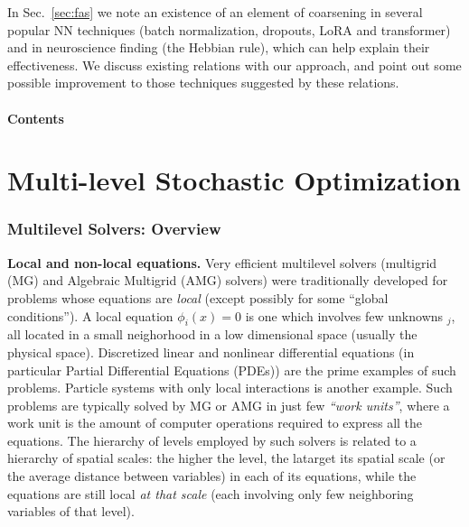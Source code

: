 \documentclass{article} %
\begin{document}
In Sec.~\ref{sec:fas} we note an existence of an element of coarsening in several popular NN techniques (batch normalization, dropouts, LoRA and transformer) and in neuroscience finding (the Hebbian rule), which can help explain their effectiveness. We discuss existing relations with our approach, and point out some possible improvement to those techniques suggested by these relations.

\subsection{Contents}
\tableofcontents


\newpage
\part{Multi-level Stochastic Optimization}
\label{sec:stochastic_optimization}

\section{Multilevel Solvers: Overview}
{\bf Local and non-local equations.} Very efficient multilevel solvers (multigrid (MG) and Algebraic Multigrid (AMG) solvers) were traditionally developed for problems whose equations are {\it local} (except possibly for some ``global conditions''). A local equation $\phi_i(x)=0$ is one which involves few unknowns $_j$, all located in a small neighorhood in a low dimensional space (usually the physical space). Discretized linear and nonlinear differential equations (in particular Partial Differential Equations (PDEs)) are the prime examples of such problems. Particle systems with only local interactions is another example. Such problems are typically solved by MG or AMG in just few {\it ``work units''}, where a work unit is the amount of computer operations required to express all the equations. The hierarchy of levels employed by such solvers is related to a hierarchy of spatial scales: the higher the level, the latarget its spatial scale (or the average distance between variables) in each of its equations, while the equations are still local {\it at that scale} (each involving only few neighboring variables of that level).
\end{document}
